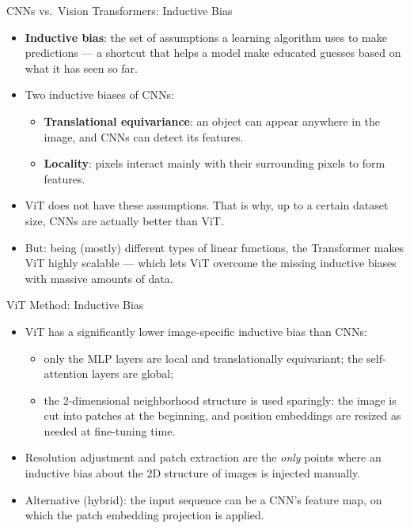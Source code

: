 \begin{frame}{CNNs vs.\ Vision Transformers: Inductive Bias}
\small%
\begin{itemize}
  \item \textbf{Inductive bias}: the set of assumptions a learning algorithm uses to make predictions --- a shortcut that helps a model make educated guesses based on what it has seen so far.
  \item Two inductive biases of CNNs:
  \begin{itemize}
    \item \textbf{Translational equivariance}: an object can appear anywhere in the image, and CNNs can detect its features.
    \item \textbf{Locality}: pixels interact mainly with their surrounding pixels to form features.
  \end{itemize}
  \item ViT does not have these assumptions. That is why, up to a certain dataset size, CNNs are actually better than ViT.
  \item But: being (mostly) different types of linear functions, the Transformer makes ViT highly scalable --- which lets ViT overcome the missing inductive biases with massive amounts of data.
\end{itemize}
\end{frame}

\begin{frame}{ViT Method: Inductive Bias}
\begin{itemize}
  \item ViT has a significantly lower image-specific inductive bias than CNNs:
  \begin{itemize}
    \item only the MLP layers are local and translationally equivariant; the self-attention layers are global;
    \item the 2-dimensional neighborhood structure is used sparingly: the image is cut into patches at the beginning, and position embeddings are resized as needed at fine-tuning time.
  \end{itemize}
  \item Resolution adjustment and patch extraction are the \emph{only} points where an inductive bias about the 2D structure of images is injected manually.
  \item Alternative (hybrid): the input sequence can be a CNN's feature map, on which the patch embedding projection is applied.
\end{itemize}
\end{frame}

